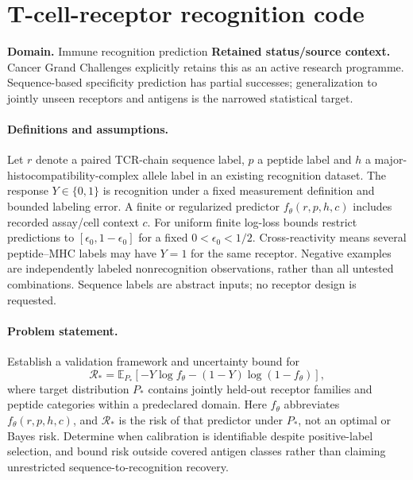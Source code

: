 \documentclass[11pt]{article}
\begin{document}
\section*{T-cell-receptor recognition code}
\label{prob:231}
\label{rank:34}
\par\smallskip

\noindent\textbf{Domain.} Immune recognition prediction \quad \textbf{Retained status/source context.} Cancer Grand Challenges explicitly retains this as an active research programme. Sequence-based specificity prediction has partial successes; generalization to jointly unseen receptors and antigens is the narrowed statistical target.
\paragraph{Definitions and assumptions.} Let $r$ denote a paired TCR-chain sequence label, $p$ a peptide label and $h$ a major-histocompatibility-complex allele label in an existing recognition dataset. The response $Y\in\{0,1\}$ is recognition under a fixed measurement definition and bounded labeling error. A finite or regularized predictor $f_\theta(r,p,h,c)$ includes recorded assay/cell context $c$. For uniform finite log-loss bounds restrict predictions to $[\epsilon_0,1-\epsilon_0]$ for a fixed $0<\epsilon_0<1/2$. Cross-reactivity means several peptide--MHC labels may have $Y=1$ for the same receptor. Negative examples are independently labeled nonrecognition observations, rather than all untested combinations. Sequence labels are abstract inputs; no receptor design is requested.
\paragraph{Problem statement.} Establish a validation framework and uncertainty bound for
    \[\mathcal R_*=\mathbb{E}_{P_*}[-Y\log f_\theta-(1-Y)\log(1-f_\theta)],\]
    where target distribution $P_*$ contains jointly held-out receptor families and peptide categories within a predeclared domain. Here $f_\theta$ abbreviates $f_\theta(r,p,h,c)$, and $\mathcal R_*$ is the risk of that predictor under $P_*$, not an optimal or Bayes risk. Determine when calibration is identifiable despite positive-label selection, and bound risk outside covered antigen classes rather than claiming unrestricted sequence-to-recognition recovery.
\end{document}
